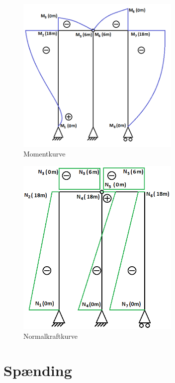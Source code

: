 \begin{figure}[H]
	\centering
	\includegraphics[width=0.7\textwidth]{billeder/skkm.png}
	\caption{Momentkurve}
	\label{fig:momentkurve}
\end{figure}

\begin{figure}[H]
	\centering
	\includegraphics[width=0.7\textwidth]{billeder/SKFN.png}
	\caption{Normalkraftkurve}
	\label{fig:normalkraftkurve}
\end{figure}

\section{Spænding}

